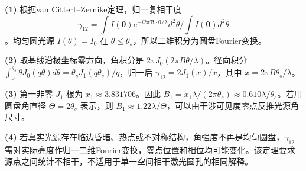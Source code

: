 \par\noindent\textbf{(1)} 根据van Cittert–Zernike定理，归一复相干度 \[\gamma_{12}=\int I(\boldsymbol\theta)e^{-i2\pi\boldsymbol B\cdot\boldsymbol\theta/\lambda}d^2\theta/\int I(\boldsymbol\theta)d^2\theta\]。均匀圆光源 \(I(\theta)=I_0\) 在 \(\theta\le\theta_s\)，所以二维积分为圆盘Fourier变换。
\par\noindent\textbf{(2)} 取基线沿极坐标零方向，角积分是 \(2\pi J_0(2\pi B\theta/\lambda)\)。径向积分 \(\int_0^{\theta_s}\theta J_0(q\theta)d\theta=\theta_sJ_1(q\theta_s)/q\)，归一后 \(\gamma_{12}=2J_1(x)/x\)，其中 \(x=2\pi B\theta_s/\lambda\)。
\par\noindent\textbf{(3)} 第一非零 \(J_1\) 根为 \(x_1\approx3.831706\)。因此 \(B_1=x_1\lambda/(2\pi\theta_s)\approx0.610\lambda/\theta_s\)。若用圆盘角直径 \(\Theta=2\theta_s\) 表示，则 \(B_1\approx1.22\lambda/\Theta\)，可以由干涉可见度零点反推光源角尺寸。
\par\noindent\textbf{(4)} 若真实光源存在临边昏暗、热点或不对称结构，角强度不再是均匀圆盘，\(\gamma_{12}\) 需对实际亮度作归一二维Fourier变换，零点位置和相位均可能变化。该定理要求源点之间统计不相干，不适用于单一空间相干激光圆孔的相同解释。

